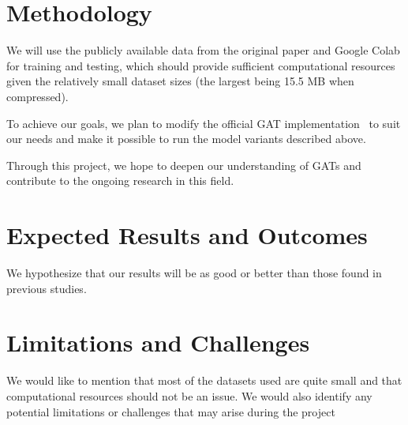 \documentclass{article}
\begin{document}
    \section{Methodology}\label{sec:methodology}
    We will use the publicly available data from the original paper and Google Colab for training and testing, which should provide sufficient computational resources given the relatively small dataset sizes (the largest being 15.5 MB when compressed).

    To achieve our goals, we plan to modify the official GAT implementation~\cite{petarvgatgithub} to suit our needs and make it
    possible to run the model variants described above.

    Through this project, we hope to deepen our understanding of GATs and contribute to the ongoing research in this field.

    \section{Expected Results and Outcomes}\label{sec:expected-results-and-outcomes}
    We hypothesize that our results will be as good or better than those found in previous studies.

    \section{Limitations and Challenges}\label{sec:limitations-and-challenges}
    We would like to mention that most of the datasets used are quite small and that computational resources should
    not be an issue.
    We would also identify any potential limitations or challenges that may arise during the project

    
\end{document}
